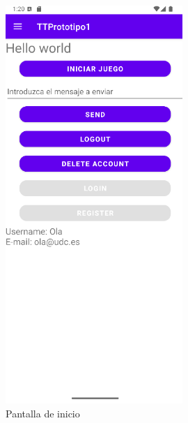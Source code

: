 \documentclass[a4paper,openright,12pt]{article}
\begin{document}
\begin{figure}[htp]
\begin{minipage}{0.3\textwidth}
        \includegraphics[width=0.6\textwidth]{Images/Vista_It3.png} 
        \caption{Pantalla de inicio}
        \label{fig:Pantalla de inicio}
    \end{minipage}
    \hfill
    \begin{minipage}{0.3\textwidth}
        \centering

\end{minipage}
\end{figure}
\end{document}
